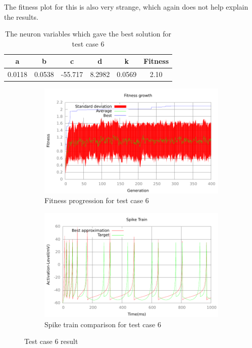 The fitness plot for this is also very strange, which again does not help
explain the results.
\begin{table}
	\begin{tabular}{c c c c c c}
		a & b & c & d & k & Fitness\\
		\hline
		0.0118 & 0.0538 & -55.717 & 8.2982 & 0.0569 & 2.10
	\end{tabular}
	\caption{The neuron variables which gave the best solution for test case
	6}
\end{table}
\begin{figure}[h]
	\centering
	\begin{subfigure}[b]{0.5\textwidth}
		\includegraphics[width=\textwidth]{../output/wdm_izzy_2_fitness.pdf}
		\caption{Fitness progression for test case 6}
		\label{fig:fitness-test-case-6}
	\end{subfigure}%
	\begin{subfigure}[b]{0.5\textwidth}
		\includegraphics[width=\textwidth]{../output/wdm_izzy_2_spike.pdf}
		\caption{Spike train comparison for test case 6}
		\label{fig:spike-test-case-6}
	\end{subfigure}
	\caption{Test case 6 result}
\end{figure}

